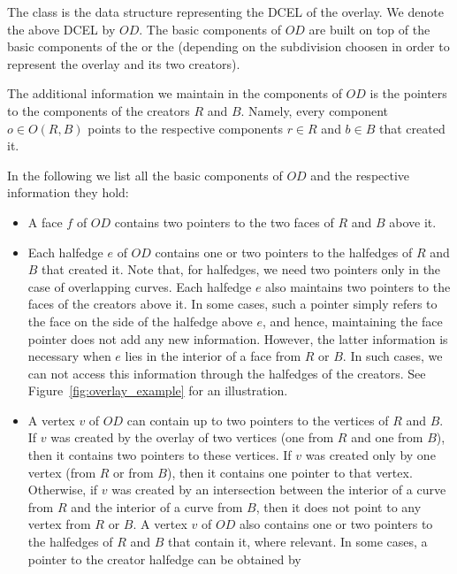 The 
class is the data structure representing the DCEL of the overlay. 
We denote the above DCEL by $OD$.
The basic components of $OD$ are built 
on top of the basic components of the  or 
the  
(depending on the subdivision choosen in 
order to represent the overlay and its two creators).

The additional information we maintain in the components of $OD$ 
is the pointers to the components of the creators $R$ and $B$.
Namely, every component $o \in O(R,B)$ points to the 
respective components $r \in R$ and $b \in B$ that created it. 

In the following we list all the basic components of $OD$ and 
the respective information they hold:
\begin{itemize}
\item A face $f$ of $OD$ contains two pointers 
to the two faces of $R$ and $B$ above it.
\item Each halfedge $e$ of $OD$ contains one or two pointers 
to the halfedges of $R$ and $B$ that created it. 
Note that, for halfedges, we need two pointers only 
in the case of overlapping curves. 
Each halfedge $e$ also maintains two pointers to the faces of the 
creators above it. 
In some cases, such a pointer simply refers to the face on the 
side of the halfedge above $e$, and hence, maintaining the face 
pointer does not add any new information. 
However, the latter information is necessary when $e$ lies in 
the interior of a face from $R$ or $B$.
In such cases, we can not access this information through the 
halfedges of the creators. 
See Figure~\ref{fig:overlay_example} for an illustration.
\item A vertex $v$ of $OD$ can contain up to two pointers to the 
vertices of $R$ and $B$. If $v$ was created by the overlay of 
two vertices (one from $R$ and one from $B$), then it contains 
two pointers to these vertices.
If $v$ was created only by one vertex (from $R$ or from $B$), then 
it contains one pointer to that vertex. Otherwise, if $v$ was 
created by an intersection between the interior of a curve from 
$R$ and the interior of a curve from $B$, then it does not point 
to any vertex from $R$ or $B$. 
A vertex $v$ of $OD$ also contains one or two pointers 
to the halfedges of $R$ and $B$ that contain it, where relevant. 
In some cases, a pointer to the creator halfedge can be obtained by 

\end{itemize}
